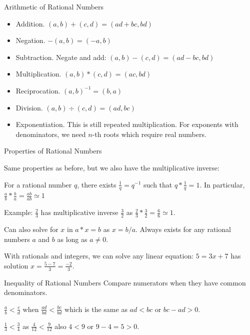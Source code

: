 \documentclass{beamer}
\begin{document}
\begin{frame}{Arithmetic of  Rational Numbers}


\begin{itemize}
\item Addition.  $(a,b) + (c,d) =  (ad+ bc, bd)$
\item Negation. $-(a,b) = (-a, b)$
\item Subtraction. Negate and add:  $(a,b) - (c,d) = (ad -bc, bd)$
\item Multiplication.  $(a,b)*(c,d) = (ac, bd)$
\item Reciprocation. $(a,b)^{-1} = (b, a)$
\item Division. $(a,b) \div (c,d) = (ad, bc)$
\item Exponentiation. This is still repeated multiplication. For exponents with denominators, we need $n$-th roots which require real numbers. 
\end{itemize} 

\end{frame}

\begin{frame}{Properties of Rational Numbers}

Same properties as before, but we also have the multiplicative inverse: 

For a rational number $q$, there exists $\frac{1}{q} = q^{-1}$ such that $q*\frac{1}{q} = 1$. In particular, $\frac{a}{b} * \frac{b}{a} = \frac{ab}{ab} \simeq 1$

Example: $\frac{2}{3}$ has multiplicative inverse $\frac{3}{2}$ as $\frac{2}{3} * \frac{3}{2} = \frac{6}{6} \simeq 1$.

Can also solve for $x$ in $a*x = b$ as $x = b/a$. Always exists for any rational numbers $a$ and $b$ as long as $a \neq 0$.

With rationals and integers, we can solve any linear equation: $5 = 3x + 7$ has solution $x = \frac{5-7}{3}= \frac{-2}{3}$. 

\end{frame}

\begin{frame}{Inequality of Rational Numbers}
    Compare numerators when they have common denominators. 

    $\frac{a}{b} < \frac{c}{d}$ when $\frac{ad}{bd} < \frac{bc}{bd}$ which is the same as $ad < bc$ or $bc-ad > 0$.

    $\frac{1}{3} < \frac{3}{4}$ as $\frac{4}{12}< \frac{9}{12}$ also $4 < 9$ or $9-4 = 5 > 0$.

\end{frame}
\end{document}
